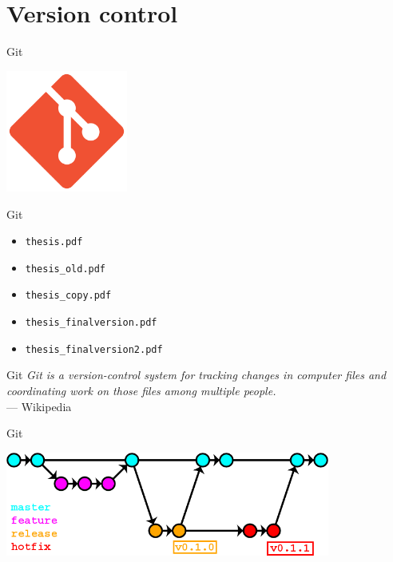    \section{Version control}

    \begin{frame}[fragile]{Git}
        \begin{center}
            \includegraphics[width=0.3\textwidth]{img/git_logo.png}
        \end{center}
    \end{frame}

    \begin{frame}[t,fragile]{Git}
        \begin{itemize}
            \item{\texttt{thesis.pdf}}
            \item{\texttt{thesis\_old.pdf}}
            \item{\texttt{thesis\_copy.pdf}}
            \item{\texttt{thesis\_finalversion.pdf}}
            \item{\texttt{thesis\_finalversion2.pdf}}
        \end{itemize}
    \end{frame}

    \begin{frame}[fragile]{Git}
        \emph{Git is a version-control system for tracking changes in computer files
        and coordinating work on those files among multiple people.} \\
        \hspace{10cm}--- Wikipedia
    \end{frame}

    \begin{frame}[fragile]{Git}
        \begin{center}
            \includegraphics[width=0.8\textwidth]{img/git_branches.png}
        \end{center}
    \end{frame}

